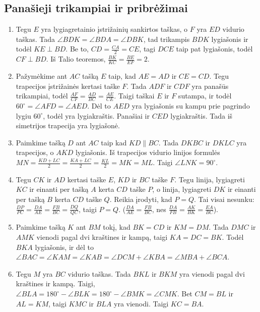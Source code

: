 \subsection*{Panašieji trikampiai ir pribrėžimai}
\begin{enumerate}
\item
  Tegu $E$ yra lygiagretainio įstrižainių sankirtos taškas, o $F$ yra $ED$
  vidurio taškas. Tada $\angle BDK = \angle BDA = \angle DBK$, tad
  trikampis $BDK$ lygiašonis ir todėl $KE \perp{BD}$. Be to, $CD =
  \frac{CA}{2} = CE$, tagi $DCE$ taip pat lygiašonis, todėl $CF
  \perp{BD}$. Iš Talio teoremos, $\frac{BK}{KC} = \frac{BE}{EF} = 2$.  
\item
  Pažymėkime ant $AC$ tašką $E$ taip, kad $AE = AD$ ir $CE = CD$. Tegu
  trapecijos įstrižainės kertasi taške $F$.  Tada $ADF$ ir $CDF$ yra
  panašūs trikampiai, todėl $\frac{AF}{CF} = \frac{AD}{BC} =
  \frac{AE}{CE}$. Taigi taškai $E$ ir $F$ sutampa, ir todėl $60^\circ =
  \angle AFD = \angle AED$. Dėl to $AED$ yra lygiašonis su kampu prie
  pagrindo lygiu $60^\circ$, todėl yra lygiakraštis.  Panašiai ir $CED$
  lygiakraštis. Tada iš simetrijos trapecija yra lygiašonė.  
\item
  Paimkime tašką $D$ ant $AC$ taip kad $KD\parallel{BC}$.  Tada $DKBC$ ir
  $DKLC$ yra trapecijos, o $AKD$ lygiašonis.  Iš trapecijos vidurio
  linijos formulės $MN = \frac{KD+LC}{2} = \frac{KA+LC}{2} = \frac{KL}{2}
  = MK = ML$. Taigi $\angle LNK = 90^\circ$. 
\item
  Tegu $CK$ ir $AD$ kertasi taške $E$, $KD$ ir $BC$ taške $F$. Tegu
  linija, lygiagreti $KC$ ir einanti per tašką $A$ kerta $CD$ taške $P$, o
  linija, lygiagreti $DK$ ir einanti per tašką $B$ kerta $CD$ taške $Q$.
  Reikia įrodyti, kad $P = Q$. Tai visai nesunku: $\frac{DP}{PC} =
  \frac{DA}{AE} = \frac{FB}{BC} = \frac{DQ}{QC}$, taigi $P = Q$.
  ($\frac{DA}{AE} = \frac{FB}{BC}$, nes $\frac{DA}{FB} = \frac{AK}{BK} =
  \frac{EA}{BC}$).  
\item
  Paimkime tašką $K$ ant $BM$ tokį, kad $BK = CD$ ir $KM = DM$.  Tada
  $DMC$ ir $AMK$ vienodi pagal dvi kraštines ir kampą, taigi $KA = DC =
  BK$. Todėl $BKA$ lygiašonis, ir dėl to $\angle BAC = \angle KAM = \angle
  KAB = \angle DCM + \angle KBA = \angle MBA + \angle BCA$.
\item
  Tegu $M$ yra $BC$ vidurio taškas. Tada $BKL$ ir $BKM$ yra vienodi pagal
  dvi kraštines ir kampą. Taigi, $\angle BLA = 180^\circ - \angle BLK =
  180^\circ - \angle BMK = \angle CMK$. Bet $CM = BL$ ir $AL = KM$, taigi
  $KMC$ ir $BLA$ yra vienodi. Taigi $KC = BA$. 

\end{enumerate}
